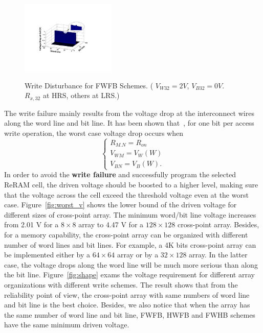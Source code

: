 \begin{figure}%
\centering
  \includegraphics[width=0.4\textwidth]{./figures/FWFB4.pdf}\\
  \caption{Write Disturbance for FWFB Schemes. ( $V_{W32} = 2V$, $V_{B32} = 0V$. $R_{x,32}$ at HRS, others at LRS.) }\label{fig:FWFR}
\end{figure}

The write failure mainly results from the voltage drop at the interconnect wires along the word line and bit line. It has been shown that~\cite{crossbar_TED_2010}, for one bit per access write operation, the worst case voltage drop occurs when
\begin{equation}
\left\{
\begin{array}{l}
R_{M.N}=R_{on}\\
V_{WM}=V_W(W)\\
V_{BN}=V_B(W).
\end{array} \right.
\end{equation}
In order to avoid the \textbf{write failure} and successfully program the
selected ReRAM cell, the driven voltage should be boosted to a higher
level, making sure that the voltage across the cell exceed the threshold
voltage even at the worst case. Figure~\ref{fig:worst_v} shows the lower bound of the driven voltage for different sizes of cross-point array. The minimum word/bit line voltage increases from 2.01 V for a $8 \times 8$ array to 4.47 V for a $128 \times 128$ cross-point array. Besides, for a  memory capability, the cross-point array can be organized with different number of word lines and bit lines. For example, a 4K bits cross-point array can be implemented either by a $64 \times 64$ array or by a $32 \times 128$ array. In the latter case, the voltage drops along the word line will be much more serious than along the bit line. Figure~\ref{fig:shape}
exams the voltage requirement for different array organizations with different write schemes. The result shows that from the reliability point of view, the cross-point array with same numbers of word line and bit line is the best choice. Besides, we also notice that when the array has the same number of word line and bit line, FWFB, HWFB and FWHB schemes have the same minimum driven voltage.

